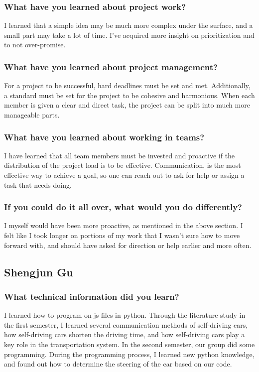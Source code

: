 \documentclass[onecolumn, draftclsnofoot,10pt, compsoc]{IEEEtran}
\begin{document}
\subsubsection{What have you learned about project work?}
I learned that a simple idea may be much more complex under the surface, and a small part may take a lot of time.
I’ve acquired more insight on prioritization and to not over-promise.
\subsubsection{What have you learned about project management?}
For a project to be successful, hard deadlines must be set and met.
Additionally, a standard must be set for the project to be cohesive and harmonious.
When each member is given a clear and direct task, the project can be split into much more manageable parts.
\subsubsection{What have you learned about working in teams?}
I have learned that all team members must be invested and proactive if the distribution of the project load is to be effective.
Communication, is the most effective way to achieve a goal, so one can reach out to ask for help or assign a task that needs doing.
\subsubsection{If you could do it all over, what would you do differently?}
I myself would have been more proactive, as mentioned in the above section.
I felt like I took longer on portions of my work that I wasn’t sure how to move forward with, and should have asked for direction or help earlier and more often.
\subsection{Shengjun Gu}
\subsubsection{What technical information did you learn?}
I learned how to program on js files in python.
Through the literature study in the first semester, I learned several communication methods of self-driving cars, how self-driving cars shorten the driving time, and how self-driving cars play a key role in the transportation system.
In the second semester, our group did some programming.
During the programming process, I learned new python knowledge, and found out how to determine the steering of the car based on our code.
\end{document}

